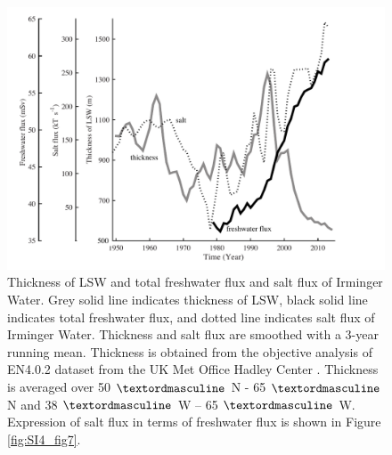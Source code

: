\clearpage
\begin{figure}
	\centering
	\includegraphics{figs_chpt4/Fig5.pdf}	
	\caption[Thickness of LSW and total freshwater flux and salt flux of Irminger Water.]{Thickness of LSW and total freshwater flux and salt flux of Irminger Water.  Grey solid line indicates thickness of LSW, black solid line indicates total freshwater flux, and dotted line indicates salt flux of Irminger Water.  Thickness and salt flux are smoothed with a 3-year running mean.  Thickness is obtained from the objective analysis of EN4.0.2 dataset from the UK Met Office Hadley Center \cite[]{good2013}. Thickness is averaged over 50 $\textordmasculine$ N - 65 $\textordmasculine$ N and 38 $\textordmasculine$ W – 65 $\textordmasculine$ W.  Expression of salt flux in terms of freshwater flux is shown in Figure \ref{fig:SI4_fig7}.}
	\label{fig:chpt4_fig5}
\end{figure}